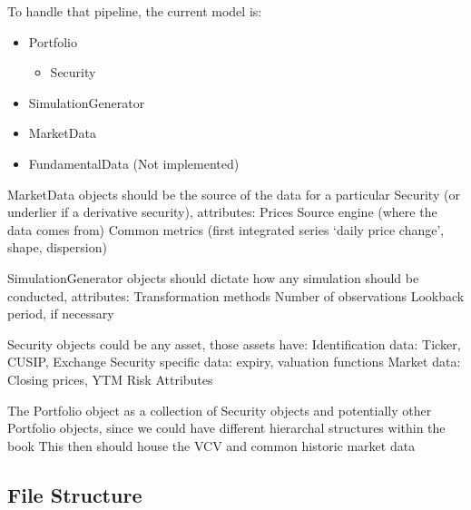 \documentclass[letterpaper,10pt,english]{sphinxmanual}
\begin{document}
\sphinxAtStartPar
To handle that pipeline, the current model is:
\begin{itemize}
\item {} 
\sphinxAtStartPar
Portfolio
\begin{itemize}
\item {} 
\sphinxAtStartPar
Security

\end{itemize}

\item {} 
\sphinxAtStartPar
SimulationGenerator

\item {} 
\sphinxAtStartPar
MarketData

\item {} 
\sphinxAtStartPar
FundamentalData (Not implemented)

\end{itemize}

\sphinxAtStartPar
MarketData objects should be the source of the data for a particular
Security (or underlier if a derivative security), attributes: \sphinxhyphen{} Prices \sphinxhyphen{}
Source engine (where the data comes from) \sphinxhyphen{} Common metrics (first
integrated series ‘daily price change’, shape, dispersion)

\sphinxAtStartPar
SimulationGenerator objects should dictate how any simulation should be
conducted, attributes: \sphinxhyphen{} Transformation methods \sphinxhyphen{} Number of observations
\sphinxhyphen{} Lookback period, if necessary

\sphinxAtStartPar
Security objects could be any asset, those assets have: \sphinxhyphen{} Identification
data: Ticker, CUSIP, Exchange \sphinxhyphen{} Security specific data: expiry,
valuation functions \sphinxhyphen{} Market data: Closing prices, YTM \sphinxhyphen{} Risk Attributes

\sphinxAtStartPar
The Portfolio object as a collection of Security objects and potentially
other Portfolio objects, since we could have different hierarchal
structures within the book \sphinxhyphen{} This then should house the VCV and common
historic market data


\subsection{File Structure}
\label{\detokenize{readme:file-structure}}
\begin{sphinxVerbatim}[commandchars=\\\{\}]
    
    
    
    
    
\end{sphinxVerbatim}
\end{document}
